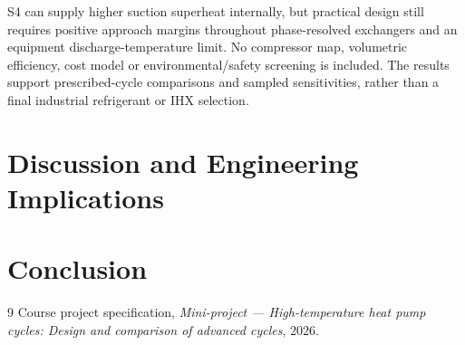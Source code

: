 \documentclass[11pt,a4paper]{article}
\begin{document}
S4 can supply higher suction superheat internally, but practical design
still requires positive approach margins throughout phase-resolved
exchangers and an equipment discharge-temperature limit. No compressor
map, volumetric efficiency, cost model or environmental/safety screening
is included. The results support prescribed-cycle comparisons and sampled
sensitivities, rather than a final industrial refrigerant or IHX selection.

\section{Discussion and Engineering Implications}

\section{Conclusion}

\begin{thebibliography}{9}
Course project specification, \emph{Mini-project --- High-temperature heat
pump cycles: Design and comparison of advanced cycles}, 2026.
\end{thebibliography}
\end{document}
